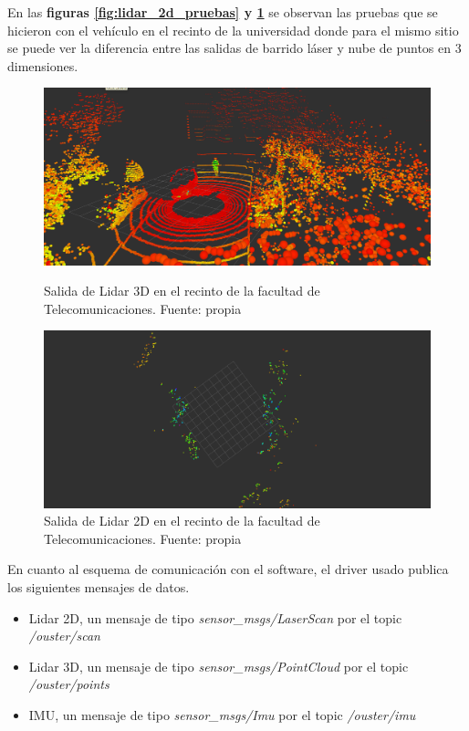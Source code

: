 En las \textbf{figuras \ref{fig:lidar_2d_pruebas} y \ref{fig:lidar_3d_pruebas}} se observan las pruebas que se hicieron con el vehículo en el recinto 
de la universidad donde para el mismo sitio se puede ver la diferencia entre las salidas de barrido láser y nube de puntos en 3 dimensiones.



\begin{figure}[htbp]
  \centering
  \begin{minipage}[b]{0.45\textwidth}
    \centering
    \includegraphics[width=\textwidth]{images/lidar3d_2.png}
    \caption{Salida de Lidar 3D en el recinto de la facultad de Telecomunicaciones. Fuente: propia}
    \label{fig:lidar_2d_pruebas}
  \end{minipage}
  \hfill
  \begin{minipage}[b]{0.45\textwidth}
    \centering
    \includegraphics[width=\textwidth]{images/lidar2d.png}
    \caption{Salida de Lidar 2D en el recinto de la facultad de Telecomunicaciones. Fuente: propia}
    \label{fig:lidar_3d_pruebas}
  \end{minipage}
\end{figure}

En cuanto al esquema de comunicación con el software, el driver usado publica los siguientes mensajes de datos.
\begin{itemize}
    \item Lidar 2D, un mensaje de tipo \textit{sensor\_msgs/LaserScan} por el topic \textit{/ouster/scan}
    \item Lidar 3D, un mensaje de tipo \textit{sensor\_msgs/PointCloud} por el topic \textit{/ouster/points}
    \item IMU, un mensaje de tipo \textit{sensor\_msgs/Imu} por el topic \textit{/ouster/imu}
\end{itemize}

